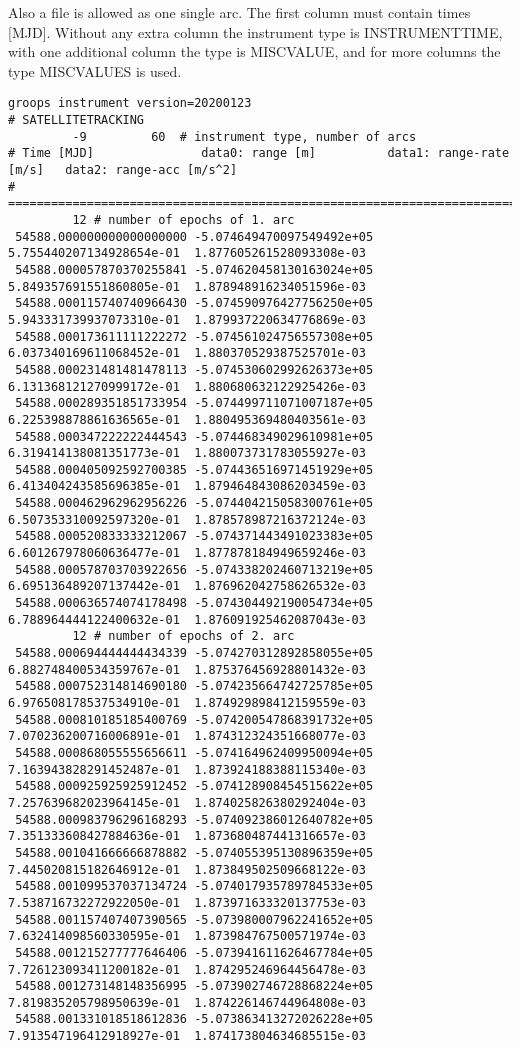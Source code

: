 Also a  file is allowed as one single arc. The first column must contain times [MJD]. Without any extra column
the instrument type is INSTRUMENTTIME, with one additional column the type is MISCVALUE, and for more columns the type
MISCVALUES is used.

\begin{verbatim}
groops instrument version=20200123
# SATELLITETRACKING
         -9         60  # instrument type, number of arcs
# Time [MJD]               data0: range [m]          data1: range-rate [m/s]   data2: range-acc [m/s^2]
# =====================================================================================================
         12 # number of epochs of 1. arc
 54588.000000000000000000 -5.074649470097549492e+05  5.755440207134928654e-01  1.877605261528093308e-03
 54588.000057870370255841 -5.074620458130163024e+05  5.849357691551860805e-01  1.878948916234051596e-03
 54588.000115740740966430 -5.074590976427756250e+05  5.943331739937073310e-01  1.879937220634776869e-03
 54588.000173611111222272 -5.074561024756557308e+05  6.037340169611068452e-01  1.880370529387525701e-03
 54588.000231481481478113 -5.074530602992626373e+05  6.131368121270999172e-01  1.880680632122925426e-03
 54588.000289351851733954 -5.074499711071007187e+05  6.225398878861636565e-01  1.880495369480403561e-03
 54588.000347222222444543 -5.074468349029610981e+05  6.319414138081351773e-01  1.880073731783055927e-03
 54588.000405092592700385 -5.074436516971451929e+05  6.413404243585696385e-01  1.879464843086203459e-03
 54588.000462962962956226 -5.074404215058300761e+05  6.507353310092597320e-01  1.878578987216372124e-03
 54588.000520833333212067 -5.074371443491023383e+05  6.601267978060636477e-01  1.877878184949659246e-03
 54588.000578703703922656 -5.074338202460713219e+05  6.695136489207137442e-01  1.876962042758626532e-03
 54588.000636574074178498 -5.074304492190054734e+05  6.788964444122400632e-01  1.876091925462087043e-03
         12 # number of epochs of 2. arc
 54588.000694444444434339 -5.074270312892858055e+05  6.882748400534359767e-01  1.875376456928801432e-03
 54588.000752314814690180 -5.074235664742725785e+05  6.976508178537534910e-01  1.874929898412159559e-03
 54588.000810185185400769 -5.074200547868391732e+05  7.070236200716006891e-01  1.874312324351668077e-03
 54588.000868055555656611 -5.074164962409950094e+05  7.163943828291452487e-01  1.873924188388115340e-03
 54588.000925925925912452 -5.074128908454515622e+05  7.257639682023964145e-01  1.874025826380292404e-03
 54588.000983796296168293 -5.074092386012640782e+05  7.351333608427884636e-01  1.873680487441316657e-03
 54588.001041666666878882 -5.074055395130896359e+05  7.445020815182646912e-01  1.873849502509668122e-03
 54588.001099537037134724 -5.074017935789784533e+05  7.538716732272922050e-01  1.873971633320137753e-03
 54588.001157407407390565 -5.073980007962241652e+05  7.632414098560330595e-01  1.873984767500571974e-03
 54588.001215277777646406 -5.073941611626467784e+05  7.726123093411200182e-01  1.874295246964456478e-03
 54588.001273148148356995 -5.073902746728868224e+05  7.819835205798950639e-01  1.874226146744964808e-03
 54588.001331018518612836 -5.073863413272026228e+05  7.913547196412918927e-01  1.874173804634685515e-03
\end{verbatim}


